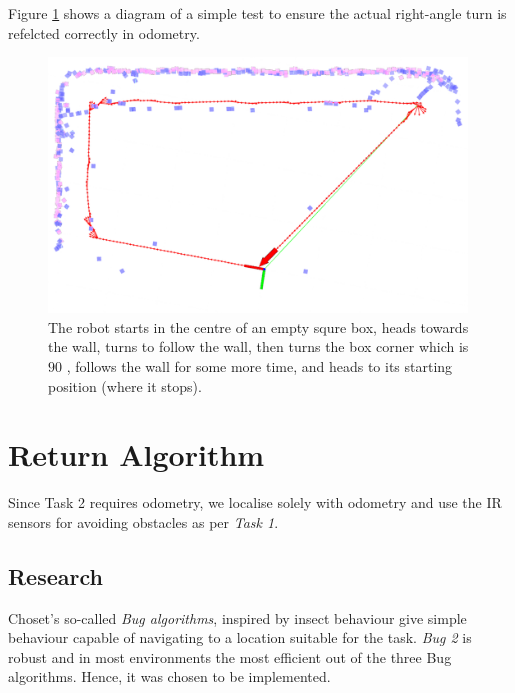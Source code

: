 \documentclass[11pt, a4paper]{article}
\begin{document}
Figure \ref{rightanglecalib} shows a diagram of a simple test to ensure the actual right-angle 
turn is refelcted correctly in odometry.

\begin{figure}[H]
  \begin{center}
    \includegraphics[width=30em]{../assets/right-angle-calibration.png}
    \caption{\label{rightanglecalib}The robot starts in the centre of an empty squre box, heads towards the wall, turns to follow the wall, then turns the box corner which is $90$ \degree, follows the wall for some more time, and heads to its starting position (where it stops).}
  \end{center}
\end{figure} 





\section{Return Algorithm}
\label{Return Algorithm}

Since Task 2 requires odometry, we localise solely with odometry and use the IR sensors for 
avoiding obstacles as per \textit{Task 1}\cite{task1_report}.


\subsection{Research}

Choset's so-called \textit{Bug algorithms}\cite{principlesrobot}, inspired by insect behaviour
give simple behaviour capable of navigating to a location suitable for the task. \textit{Bug 2} is
robust and in most environments the most efficient out of the three Bug algorithms. 
Hence, it was chosen to be implemented.
\end{document}
